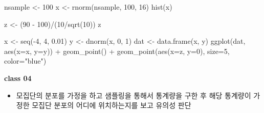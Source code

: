 \documentclass[
]{book}
\newenvironment{Shaded}{\begin{snugshade}}{\end{snugshade}}
\newcommand{\AttributeTok}[1]{\textcolor[rgb]{0.77,0.63,0.00}{#1}}
\newcommand{\DecValTok}[1]{\textcolor[rgb]{0.00,0.00,0.81}{#1}}
\newcommand{\FloatTok}[1]{\textcolor[rgb]{0.00,0.00,0.81}{#1}}
\newcommand{\FunctionTok}[1]{\textcolor[rgb]{0.00,0.00,0.00}{#1}}
\newcommand{\NormalTok}[1]{#1}
\newcommand{\OtherTok}[1]{\textcolor[rgb]{0.56,0.35,0.01}{#1}}
\newcommand{\SpecialCharTok}[1]{\textcolor[rgb]{0.00,0.00,0.00}{#1}}
\newcommand{\StringTok}[1]{\textcolor[rgb]{0.31,0.60,0.02}{#1}}
\providecommand{\tightlist}{%
  \setlength{\itemsep}{0pt}\setlength{\parskip}{0pt}}
\begin{document}
\begin{Shaded}
\begin{Highlighting}[]
\NormalTok{nsample }\OtherTok{\textless{}{-}} \DecValTok{100}
\NormalTok{x }\OtherTok{\textless{}{-}} \FunctionTok{rnorm}\NormalTok{(nsample, }\DecValTok{100}\NormalTok{, }\DecValTok{16}\NormalTok{)}
\FunctionTok{hist}\NormalTok{(x)}

\NormalTok{z }\OtherTok{\textless{}{-}}\NormalTok{ (}\DecValTok{90} \SpecialCharTok{{-}} \DecValTok{100}\NormalTok{)}\SpecialCharTok{/}\NormalTok{(}\DecValTok{10}\SpecialCharTok{/}\FunctionTok{sqrt}\NormalTok{(}\DecValTok{10}\NormalTok{))}
\NormalTok{z}

\NormalTok{x }\OtherTok{\textless{}{-}} \FunctionTok{seq}\NormalTok{(}\SpecialCharTok{{-}}\DecValTok{4}\NormalTok{, }\DecValTok{4}\NormalTok{, }\FloatTok{0.01}\NormalTok{)}
\NormalTok{y }\OtherTok{\textless{}{-}} \FunctionTok{dnorm}\NormalTok{(x, }\DecValTok{0}\NormalTok{, }\DecValTok{1}\NormalTok{)}
\NormalTok{dat }\OtherTok{\textless{}{-}} \FunctionTok{data.frame}\NormalTok{(x, y)}
\FunctionTok{ggplot}\NormalTok{(dat, }\FunctionTok{aes}\NormalTok{(}\AttributeTok{x=}\NormalTok{x, }\AttributeTok{y=}\NormalTok{y)) }\SpecialCharTok{+}
  \FunctionTok{geom\_point}\NormalTok{() }\SpecialCharTok{+}
  \FunctionTok{geom\_point}\NormalTok{(}\FunctionTok{aes}\NormalTok{(}\AttributeTok{x=}\NormalTok{z, }\AttributeTok{y=}\DecValTok{0}\NormalTok{), }\AttributeTok{size=}\DecValTok{5}\NormalTok{, }\AttributeTok{color=}\StringTok{"blue"}\NormalTok{)}
\end{Highlighting}
\end{Shaded}

\textbf{class 04}

\begin{itemize}
\tightlist
\item
  모집단의 분포를 가정을 하고 샘플링을 통해서 통계량을 구한 후 해당 통계량이 가정한 모집단 분포의 어디에 위치하는지를 보고 유의성 판단
\end{itemize}
\end{document}
